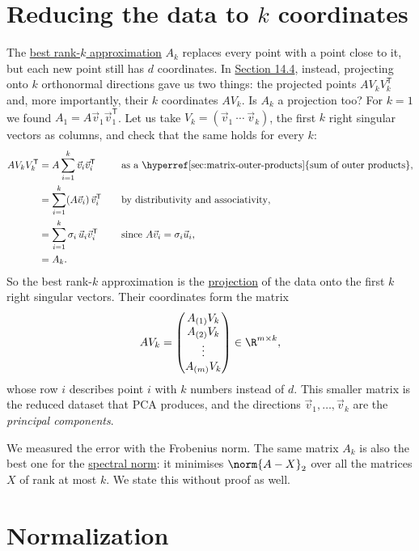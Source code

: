\documentclass[a4paper,12pt,oneside]{report}
\begin{document}
\section{Reducing the data to \texorpdfstring{$k$}{k} coordinates}
\label{sec:reduce-k-coordinates}

The \hyperref[thm:best-rank-k]{best rank-$k$ approximation} $A_k$
replaces every point with a point close to it, but each new point
still has $d$ coordinates. In
\hyperref[sec:projection-subspace]{Section 14.4}, instead, projecting
onto $k$ orthonormal directions gave us two things: the projected
points $AV_kV_k^{\mathsf T}$ and, more importantly, their $k$
coordinates $AV_k$. Is $A_k$ a projection too? For $k=1$ we found
$A_1=A\vec v_1\vec v_1^{\mathsf T}$. Let us take
$V_k=(\vec v_1\ \cdots\ \vec v_k)$, the first $k$ right singular
vectors as columns, and check that the same holds for every $k$:
\[
\begin{aligned}
  AV_kV_k^{\mathsf T}
    &=A\sum_{i=1}^{k}\vec v_i\vec v_i^{\mathsf T}
      &&\quad\text{as a \hyperref[sec:matrix-outer-products]{sum of outer products}},\\
    &=\sum_{i=1}^{k}(A\vec v_i)\,\vec v_i^{\mathsf T}
      &&\quad\text{by distributivity and associativity},\\
    &=\sum_{i=1}^{k}\sigma_i\,\vec u_i\vec v_i^{\mathsf T}
      &&\quad\text{since } A\vec v_i=\sigma_i\vec u_i,\\
    &=A_k .
\end{aligned}
\]
So the best rank-$k$ approximation is the
\hyperref[def:projection-subspace]{projection} of the data onto the
first $k$ right singular vectors. Their coordinates form the matrix
\[
  AV_k=\begin{pmatrix}
    A_{(1)}V_k\\ A_{(2)}V_k\\ \vdots\\ A_{(m)}V_k
  \end{pmatrix}\in\R^{m\times k},
\]
whose row $i$ describes point $i$ with $k$ numbers instead of $d$.
This smaller matrix is the reduced dataset that PCA produces, and the
directions $\vec v_1,\ldots,\vec v_k$ are the \emph{principal
components}.

We measured the error with the Frobenius norm. The same matrix $A_k$
is also the best one for the
\hyperref[def:spectral-norm]{spectral norm}: it minimises
$\norm{A-X}_2$ over all the matrices $X$ of rank at most $k$. We
state this without proof as well.

\section{Normalization}
\label{sec:normalization}
\end{document}
